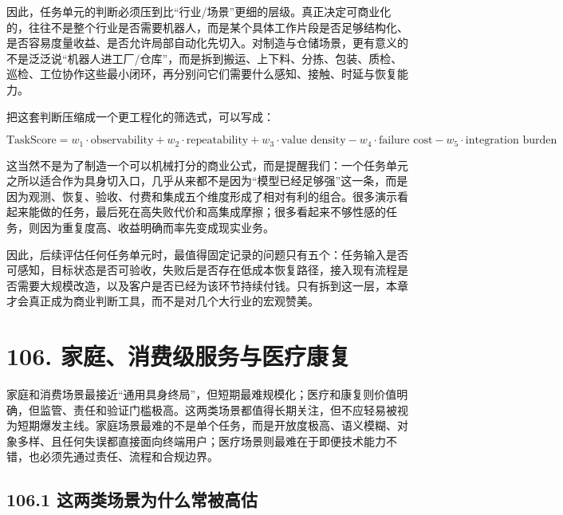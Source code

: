 因此，任务单元的判断必须压到比“行业/场景”更细的层级。真正决定可商业化的，往往不是整个行业是否需要机器人，而是某个具体工作片段是否足够结构化、是否容易度量收益、是否允许局部自动化先切入。对制造与仓储场景，更有意义的不是泛泛说“机器人进工厂/仓库”，而是拆到搬运、上下料、分拣、包装、质检、巡检、工位协作这些最小闭环，再分别问它们需要什么感知、接触、时延与恢复能力。

把这套判断压缩成一个更工程化的筛选式，可以写成：

\begingroup
\scriptsize
\begin{equation*}
\text{TaskScore} =
w_1 \cdot \text{observability}
+ w_2 \cdot \text{repeatability}
+ w_3 \cdot \text{value density}
- w_4 \cdot \text{failure cost}
- w_5 \cdot \text{integration burden}
\end{equation*}
\endgroup

这当然不是为了制造一个可以机械打分的商业公式，而是提醒我们：一个任务单元之所以适合作为具身切入口，几乎从来都不是因为“模型已经足够强”这一条，而是因为观测、恢复、验收、付费和集成五个维度形成了相对有利的组合。很多演示看起来能做的任务，最后死在高失败代价和高集成摩擦；很多看起来不够性感的任务，则因为重复度高、收益明确而率先变成现实业务。

因此，后续评估任何任务单元时，最值得固定记录的问题只有五个：任务输入是否可感知，目标状态是否可验收，失败后是否存在低成本恢复路径，接入现有流程是否需要大规模改造，以及客户是否已经为该环节持续付钱。只有拆到这一层，本章才会真正成为商业判断工具，而不是对几个大行业的宏观赞美。

\section*{106. 家庭、消费级服务与医疗康复}

家庭和消费场景最接近“通用具身终局”，但短期最难规模化；医疗和康复则价值明确，但监管、责任和验证门槛极高。这两类场景都值得长期关注，但不应轻易被视为短期爆发主线。家庭场景最难的不是单个任务，而是开放度极高、语义模糊、对象多样、且任何失误都直接面向终端用户；医疗场景则最难在于即便技术能力不错，也必须先通过责任、流程和合规边界。

\subsection*{106.1 这两类场景为什么常被高估}


